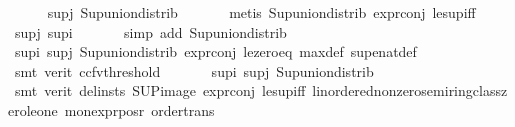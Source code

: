 \begin{isabellebody}
\ \ \ \ \isamarkupfalse%
\ sup{\isacharunderscore}{\kern0pt}j\ Sup{\isacharunderscore}{\kern0pt}union{\isacharunderscore}{\kern0pt}distrib\isanewline
\ \ \ \ \ \isamarkupfalse%
\ {\isacharparenleft}{\kern0pt}metis\ Sup{\isacharunderscore}{\kern0pt}union{\isacharunderscore}{\kern0pt}distrib\ expr{\isacharunderscore}{\kern0pt}{}{\isacharunderscore}{\kern0pt}conj\ le{\isacharunderscore}{\kern0pt}sup{\isacharunderscore}{\kern0pt}iff{\isacharparenright}{\kern0pt}\isanewline
\ \ \ \ \isamarkupfalse%
\ sup{\isacharunderscore}{\kern0pt}j\ sup{\isacharunderscore}{\kern0pt}i\isanewline
\ \ \ \ \ \isamarkupfalse%
\ {\isacharparenleft}{\kern0pt}simp\ add{\isacharcolon}{\kern0pt}\ Sup{\isacharunderscore}{\kern0pt}union{\isacharunderscore}{\kern0pt}distrib{\isacharparenright}{\kern0pt}\isanewline
\ \ \ \ \isamarkupfalse%
\ sup{\isacharunderscore}{\kern0pt}i\ sup{\isacharunderscore}{\kern0pt}j\ Sup{\isacharunderscore}{\kern0pt}union{\isacharunderscore}{\kern0pt}distrib\ expr{\isacharunderscore}{\kern0pt}{}{\isacharunderscore}{\kern0pt}conj\ le{\isacharunderscore}{\kern0pt}zero{\isacharunderscore}{\kern0pt}eq\ max{\isacharunderscore}{\kern0pt}def\ sup{\isacharunderscore}{\kern0pt}enat{\isacharunderscore}{\kern0pt}def\isanewline
\ \ \ \ \ \ \ \isamarkupfalse%
\ {\isacharparenleft}{\kern0pt}smt\ {\isacharparenleft}{\kern0pt}verit{\isacharcomma}{\kern0pt}\ ccfv{\isacharunderscore}{\kern0pt}threshold{\isacharparenright}{\kern0pt}\ {\isacharparenright}{\kern0pt}\isanewline
\ \ \ \ \isamarkupfalse%
\ sup{\isacharunderscore}{\kern0pt}i\ sup{\isacharunderscore}{\kern0pt}j\ Sup{\isacharunderscore}{\kern0pt}union{\isacharunderscore}{\kern0pt}distrib\isanewline
\ \ \ \ \isamarkupfalse%
\ {\isacharparenleft}{\kern0pt}smt\ {\isacharparenleft}{\kern0pt}verit{\isacharcomma}{\kern0pt}\ del{\isacharunderscore}{\kern0pt}insts{\isacharparenright}{\kern0pt}\ SUP{\isacharunderscore}{\kern0pt}image\ expr{\isacharunderscore}{\kern0pt}{}{\isacharunderscore}{\kern0pt}conj\ le{\isacharunderscore}{\kern0pt}sup{\isacharunderscore}{\kern0pt}iff\ linordered{\isacharunderscore}{\kern0pt}nonzero{\isacharunderscore}{\kern0pt}semiring{\isacharunderscore}{\kern0pt}class{\isachardot}{\kern0pt}zero{\isacharunderscore}{\kern0pt}le{\isacharunderscore}{\kern0pt}one\ mon{\isacharunderscore}{\kern0pt}expr{\isacharunderscore}{\kern0pt}{}{\isacharunderscore}{\kern0pt}pos{\isacharunderscore}{\kern0pt}r\ order{\isacharunderscore}{\kern0pt}trans{\isacharparenright}{\kern0pt}\isanewline

\end{isabellebody}
